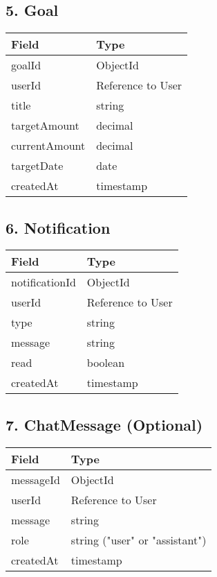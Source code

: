 \documentclass{article}
\begin{document}
\subsection*{5. Goal}
\begin{longtable}{|l|l|}
\hline
\textbf{Field} & \textbf{Type} \\ \hline
goalId & ObjectId \\ \hline
userId & Reference to User \\ \hline
title & string \\ \hline
targetAmount & decimal \\ \hline
currentAmount & decimal \\ \hline
targetDate & date \\ \hline
createdAt & timestamp \\ \hline
\end{longtable}

\subsection*{6. Notification}
\begin{longtable}{|l|l|}
\hline
\textbf{Field} & \textbf{Type} \\ \hline
notificationId & ObjectId \\ \hline
userId & Reference to User \\ \hline
type & string \\ \hline
message & string \\ \hline
read & boolean \\ \hline
createdAt & timestamp \\ \hline
\end{longtable}

\subsection*{7. ChatMessage (Optional)}
\begin{longtable}{|l|l|}
\hline
\textbf{Field} & \textbf{Type} \\ \hline
messageId & ObjectId \\ \hline
userId & Reference to User \\ \hline
message & string \\ \hline
role & string ("user" or "assistant") \\ \hline
createdAt & timestamp \\ \hline
\end{longtable}
\end{document}
